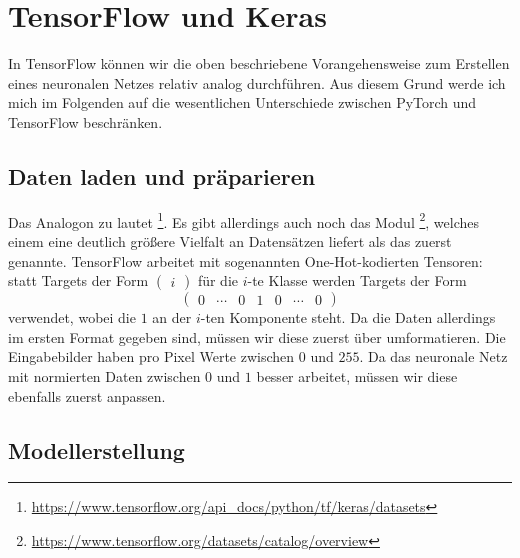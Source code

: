 \newpage



\section{TensorFlow und Keras}

In TensorFlow können wir die oben beschriebene Vorangehensweise zum Erstellen eines neuronalen Netzes 
relativ analog durchführen. Aus diesem Grund werde ich mich im Folgenden auf die wesentlichen 
Unterschiede zwischen PyTorch und TensorFlow beschränken. 

\subsection{Daten laden und präparieren}


Das Analogon zu  lautet 
\footnote{\url{https://www.tensorflow.org/api_docs/python/tf/keras/datasets}}. 
Es gibt allerdings auch noch das Modul \footnote{\url{https://www.tensorflow.org/datasets/catalog/overview}}, 
welches einem eine deutlich größere Vielfalt an Datensätzen liefert als das zuerst genannte.
TensorFlow arbeitet mit sogenannten One-Hot-kodierten Tensoren: statt Targets der Form 
\(\begin{pmatrix} i \end{pmatrix}\) für die \(i\)-te Klasse werden Targets der Form \[\begin{pmatrix}
    0 & \cdots & 0 & 1 & 0 & \cdots & 0
\end{pmatrix} \]  verwendet, wobei die \(1\) an der \(i\)-ten Komponente steht. 
Da die Daten allerdings im ersten Format gegeben sind, müssen wir diese zuerst über  umformatieren. 
Die Eingabebilder haben pro Pixel Werte zwischen \(0\) und \(255\). 
Da das neuronale Netz mit normierten Daten zwischen \(0\) und \(1\) besser arbeitet, 
müssen wir diese ebenfalls zuerst anpassen. 

\newpage

\subsection{Modellerstellung}

